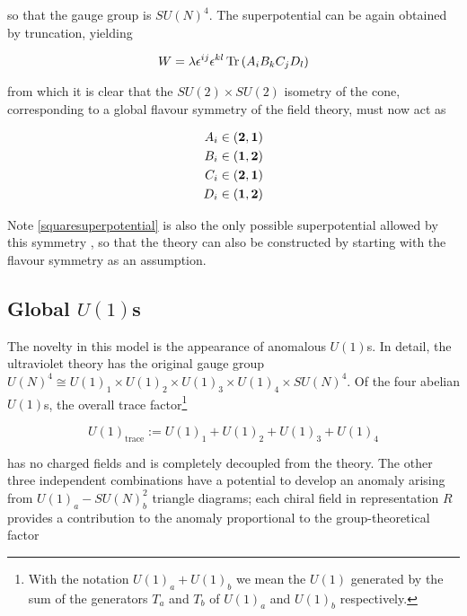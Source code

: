so that the gauge group is $SU(N)^4$. The superpotential can be again obtained by truncation, yielding

\begin{equation}
	W = \lambda \epsilon^{ij} \epsilon^{kl} \operatorname{Tr}\left( A_i B_k C_j D_l \right)
	\label{squaresuperpotential}
\end{equation}

from which it is clear that the $SU(2) \times SU(2)$ isometry of the cone, corresponding to a global flavour symmetry of the field theory, must now act as

\begin{align}
	\begin{split}
		A_i \in (\mathbf{2}, \mathbf{1})\\
		B_i \in (\mathbf{1}, \mathbf{2})\\
		C_i \in (\mathbf{2}, \mathbf{1})\\
		D_i \in (\mathbf{1}, \mathbf{2})
	\end{split}
	\label{flavoursquare}
\end{align}

Note \eqref{squaresuperpotential} is also the only possible superpotential allowed by this symmetry \cite{Benvenutifourcycles}, so that the theory can also be constructed by starting with the flavour symmetry as an assumption.

\subsection{Global $U(1)$s} \label{sec:squaresuones}

The novelty in this model is the appearance of anomalous $U(1)$s. In detail, the ultraviolet theory has the original gauge group $U(N)^4 \cong U(1)_1 \times U(1)_2 \times U(1)_3 \times U(1)_4 \times SU(N)^4$. Of the four abelian $U(1)$s, the overall trace factor\footnote{With the notation $U(1)_a + U(1)_b$ we mean the $U(1)$ generated by the sum of the generators $T_a$ and $T_b$ of $U(1)_a$ and $U(1)_b$ respectively.}

\begin{equation}	
	U(1)_\text{trace} := U(1)_1 + U(1)_2 + U(1)_3 + U(1)_4
	\label{}
\end{equation}

has no charged fields and is completely decoupled from the theory. The other three independent combinations have a potential to develop an anomaly arising from $U(1)_a-SU(N)_b^2$ triangle diagrams; each chiral field in representation $R$ provides a contribution to the anomaly proportional to the group-theoretical factor \cite{terningmodernsusy}

